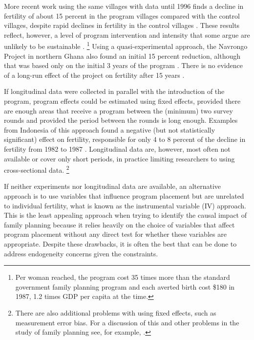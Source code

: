 \documentclass[letterpaper,12pt]{article}
\begin{document}
More recent work using the same villages with data until 1996 finds a
decline in fertility of about 15 percent in the program villages
compared with the control villages, despite rapid declines in fertility
in the control villages \citep{Sinha2005,Joshi2007}. 
These results reflect, however, a level of program intervention and
intensity that some argue are unlikely to be sustainable
\citep{pritchett94a}.%
\footnote{
Per woman reached, the program cost 35 times more than the standard
government family planning program and each averted birth cost \$180 in
1987, 1.2 times GDP per capita at the time.} 
Using a quasi-experimental approach, the Navrongo Project in northern
Ghana also found an initial 15 percent reduction, although that was
based only on the initial 3 years of the program \citep{Debpuur2002}. 
There is no evidence of a long-run effect of the project on fertility
after 15 years \citep{Phillips2012}.

If longitudinal data were collected in parallel with the introduction of
the program, program effects could be estimated using fixed effects,
provided there are enough areas that receive a program between the
(minimum) two survey rounds and provided the period between the rounds
is long enough. 
Examples from Indonesia of this approach found a negative (but not
statistically significant) effect on fertility, responsible for only 4
to 8 percent of the decline in fertility from 1982 to 1987
\citep{pitt93,Gertler1994}. 
Longitudinal data are, however, most often not available or cover only
short periods, in practice limiting researchers to using cross-sectional
data.%
\footnote{
There are also additional problems with using fixed effects, such as
measurement error bias. 
For a discussion of this and other problems in the study of family
planning see, for example, \cite{angeles98}.}

If neither experiments nor longitudinal data are available, an
alternative approach is to use variables that influence program
placement but are unrelated to individual fertility, what is known as
the instrumental variable (IV) approach. 
This is the least appealing approach when trying to identify the causal
impact of family planning because it relies heavily on the choice of
variables that affect program placement without any direct test for
whether these variables are appropriate. 
Despite these drawbacks, it is often the best that can be done to
address endogeneity concerns given the constraints.
\end{document}
